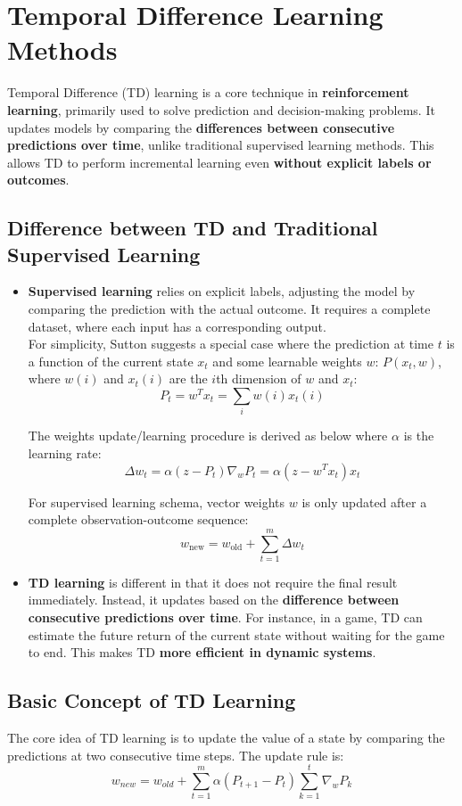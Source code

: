 \documentclass[lettersize,journal]{IEEEtran}
\begin{document}
\section{Temporal Difference Learning Methods}

Temporal Difference (TD) learning is a core technique in \textbf{reinforcement learning}, primarily used to solve prediction and decision-making problems. It updates models by comparing the \textbf{differences between consecutive predictions over time}, unlike traditional supervised learning methods. This allows TD to perform incremental learning even \textbf{without explicit labels or outcomes}.

\subsection{Difference between TD and Traditional Supervised Learning}
\begin{itemize}
    \item \textbf{Supervised learning} relies on explicit labels, adjusting the model by comparing the prediction with the actual outcome. It requires a complete dataset, where each input has a corresponding output.\\
    For simplicity, Sutton suggests a special case where the prediction at time \( t \) is a function of the current state \( x_t \) and some learnable weights \( w \): \( P(x_t, w) \), where \( w(i) \) and \( x_t(i) \) are the \(i\)th dimension of \( w \) and \( x_t \):
\[
P_t = w^T x_t = \sum_i w(i) x_t(i)
\]

The weights update/learning procedure is derived as below where \( \alpha \) is the learning rate:
\[
\Delta w_t = \alpha (z - P_t) \nabla_w P_t = \alpha (z - w^T x_t) x_t
\]

For supervised learning schema, vector weights \( w \) is only updated after a complete observation-outcome sequence:
\[
w_{\text{new}} = w_{\text{old}} + \sum_{t=1}^{m} \Delta w_t
\]

    \item \textbf{TD learning} is different in that it does not require the final result immediately. Instead, it updates based on the \textbf{difference between consecutive predictions over time}. For instance, in a game, TD can estimate the future return of the current state without waiting for the game to end. This makes TD \textbf{more efficient in dynamic systems}.
\end{itemize}

\subsection{Basic Concept of TD Learning}
The core idea of TD learning is to update the value of a state by comparing the predictions at two consecutive time steps. The update rule is:
\[w_{new}=w_{old}+\sum_{t=1}^m\alpha(P_{t+1}-P_t)\sum_{k=1}^t\nabla_wP_k\]
\end{document}
